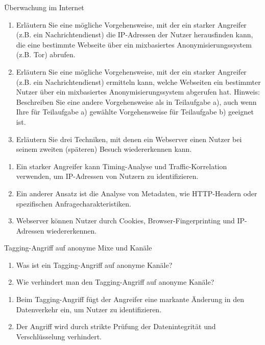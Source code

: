 \documentclass{article}
\begin{document}
\setcounter{subsection}{238}
\begin{exercise}{Überwachung im Internet}
  \begin{enumerate}
    \item Erläutern Sie eine mögliche Vorgehensweise, mit der ein starker Angreifer (z.B. ein Nachrichtendienst) die IP-Adressen der Nutzer herausfinden kann, die eine bestimmte Webseite über ein mixbasiertes Anonymisierungssystem (z.B. Tor) abrufen.
    \item Erläutern Sie eine mögliche Vorgehensweise, mit der ein starker Angreifer (z.B. ein Nachrichtendienst) ermitteln kann, welche Webseiten ein bestimmter Nutzer über ein mixbasiertes Anonymisierungssystem abgerufen hat. Hinweis: Beschreiben Sie eine andere Vorgehensweise als in Teilaufgabe a), auch wenn Ihre für Teilaufgabe a) gewählte Vorgehensweise für Teilaufgabe b) geeignet ist.
    \item Erläutern Sie drei Techniken, mit denen ein Webserver einen Nutzer bei seinem zweiten (späteren) Besuch wiedererkennen kann.
  \end{enumerate}

  \begin{solution}
    \begin{enumerate}
      \item Ein starker Angreifer kann Timing-Analyse und Traffic-Korrelation verwenden, um IP-Adressen von Nutzern zu identifizieren.
      \item Ein anderer Ansatz ist die Analyse von Metadaten, wie HTTP-Headern oder spezifischen Anfragecharakteristiken.
      \item Webserver können Nutzer durch Cookies, Browser-Fingerprinting und IP-Adressen wiedererkennen.
    \end{enumerate}
  \end{solution}
\end{exercise}

\setcounter{subsection}{2310}
\begin{exercise}{Tagging-Angriff auf anonyme Mixe und Kanäle}
  \begin{enumerate}
    \item Was ist ein Tagging-Angriff auf anonyme Kanäle?
    \item Wie verhindert man den Tagging-Angriff auf anonyme Kanäle?
  \end{enumerate}

  \begin{solution}
    \begin{enumerate}
      \item Beim Tagging-Angriff fügt der Angreifer eine markante Änderung in den Datenverkehr ein, um Nutzer zu identifizieren.
      \item Der Angriff wird durch strikte Prüfung der Datenintegrität und Verschlüsselung verhindert.
    \end{enumerate}
  \end{solution}
\end{exercise}
\end{document}

